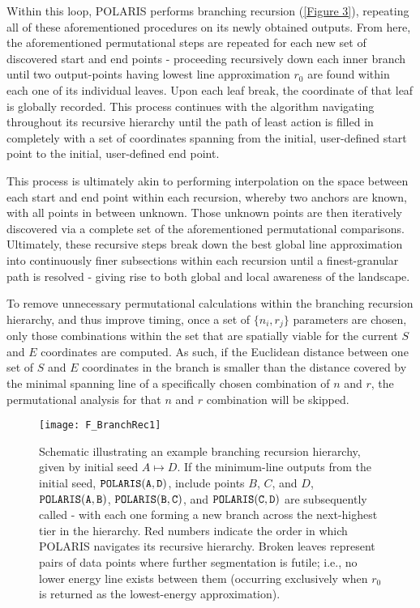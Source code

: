 \documentclass[twocolumn]{biophys-new}
\begin{document}
Within this loop, POLARIS performs branching recursion (\autoref{Figure 3}), repeating all of these aforementioned procedures on its newly obtained outputs.  From here, the aforementioned permutational steps are repeated for each new set of discovered start and end points - proceeding recursively down each inner branch until two output-points having lowest line approximation $r_{0}$ are found within each one of its individual leaves. Upon each leaf break, the coordinate of that leaf is globally recorded. This process continues with the algorithm navigating throughout its recursive hierarchy until the path of least action is filled in completely with a set of coordinates spanning from the initial, user-defined start point to the initial, user-defined end point. 

This process is ultimately akin to performing interpolation on the space between each start and end point within each recursion, whereby two anchors are known, with all points in between unknown. Those unknown points are then iteratively discovered via a complete set of the aforementioned permutational comparisons. Ultimately, these recursive steps break down the best global line approximation into continuously finer subsections within each recursion until a finest-granular path is resolved - giving rise to both global and local awareness of the landscape.

To remove unnecessary permutational calculations within the branching recursion hierarchy, and thus improve timing, once a set of $\{n_i, r_j\}$ parameters are chosen, only those combinations within the set that are spatially viable for the current $S$ and $E$ coordinates are computed. As such, if the Euclidean distance between one set of $S$ and $E$ coordinates in the branch is smaller than the distance covered by the minimal spanning line of a specifically chosen combination of $n$ and $r$, the permutational analysis for that $n$ and $r$ combination will be skipped.

\setcounter{figure}{2} 
\begin{figure}[hbt!]
\centering
\texttt{[image: F\_BranchRec1]}
\caption{Schematic illustrating an example branching recursion hierarchy, given by initial seed $A\mapsto D$. If the minimum-line outputs from the initial seed, $\tt{POLARIS(A,D)}$, include points $B$, $C$, and $D$, $\tt{POLARIS(A,B)}$, $\tt{POLARIS(B,C)}$, and $\tt{POLARIS(C,D)}$ are subsequently called - with each one forming a new branch across the next-highest tier in the hierarchy. Red numbers indicate the order in which POLARIS navigates its recursive hierarchy. Broken leaves represent pairs of data points where further segmentation is futile; i.e., no lower energy line exists between them (occurring exclusively when $r_{0}$ is returned as the lowest-energy approximation).}
\label{Figure 3}
\end{figure}
\end{document}
